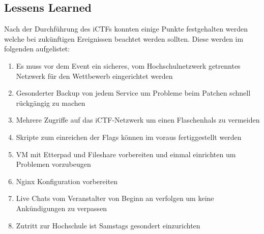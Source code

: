 \subsection{Lessens Learned}
Nach der Durchführung des iCTFs konnten einige Punkte festgehalten werden welche bei zukünftigen Ereignissen beachtet werden sollten. 
Diese werden im folgenden aufgelistet:

\begin{enumerate}
\item Es muss vor dem Event ein sicheres, vom Hochschulnetzwerk getrenntes Netzwerk für den Wettbewerb eingerichtet werden
\item Gesonderter Backup von jedem Service um Probleme beim Patchen schnell rückgängig zu machen
\item Mehrere Zugriffe auf das iCTF-Netzwerk um einen Flaschenhals zu vermeiden
\item Skripte zum einreichen der Flags können im voraus fertiggestellt werden
\item VM mit Etterpad und Fileshare vorbereiten und einmal einrichten um Problemen vorzubeugen 
\item Nginx Konfiguration vorbereiten
\item Live Chats vom Veranstalter von Beginn an verfolgen um keine Ankündigungen zu verpassen
\item Zutritt zur Hochschule ist Samstags gesondert einzurichten  
\end{enumerate}





